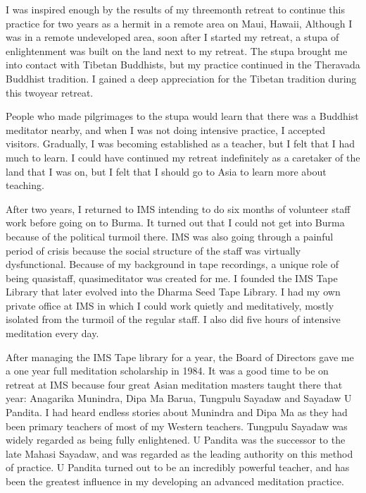 \documentclass[a5paper,10pt,english]{book}
\begin{document}
\sphinxAtStartPar
I was inspired enough by the results of my three\sphinxhyphen{}month retreat to
continue this practice for two years as a hermit in a remote area on
Maui, Hawaii, Although I was in a remote undeveloped area, soon after I
started my retreat, a stupa of enlightenment was built on the land next
to my retreat. The stupa brought me into contact with Tibetan Buddhists,
but my practice continued in the Theravada Buddhist tradition. I gained
a deep appreciation for the Tibetan tradition during this two\sphinxhyphen{}year
retreat.

\sphinxAtStartPar
People who made pilgrimages to the stupa would learn that there was a
Buddhist meditator nearby, and when I was not doing intensive practice,
I accepted visitors. Gradually, I was becoming established as a teacher,
but I felt that I had much to learn. I could have continued my retreat
indefinitely as a caretaker of the land that I was on, but I felt that I
should go to Asia to learn more about teaching.

\sphinxAtStartPar
After two years, I returned to IMS intending to do six months of
volunteer staff work before going on to Burma. It turned out that I
could not get into Burma because of the political turmoil there. IMS was
also going through a painful period of crisis because the social
structure of the staff was virtually dysfunctional. Because of my
background in tape recordings, a unique role of being quasi\sphinxhyphen{}staff,
quasi\sphinxhyphen{}meditator was created for me. I founded the IMS Tape Library that
later evolved into the Dharma Seed Tape Library. I had my own private
office at IMS in which I could work quietly and meditatively, mostly
isolated from the turmoil of the regular staff. I also did five hours of
intensive meditation every day.

\sphinxAtStartPar
After managing the IMS Tape library for a year, the Board of Directors
gave me a one year full meditation scholarship in 1984. It was a good
time to be on retreat at IMS because four great Asian meditation masters
taught there that year: Anagarika Munindra, Dipa Ma Barua, Tungpulu
Sayadaw and Sayadaw U Pandita. I had heard endless stories about
Munindra and Dipa Ma as they had been primary teachers of most of my
Western teachers. Tungpulu Sayadaw was widely regarded as being fully
enlightened. U Pandita was the successor to the late Mahasi Sayadaw, and
was regarded as the leading authority on this method of practice. U
Pandita turned out to be an incredibly powerful teacher, and has been
the greatest influence in my developing an advanced meditation practice.
\end{document}
